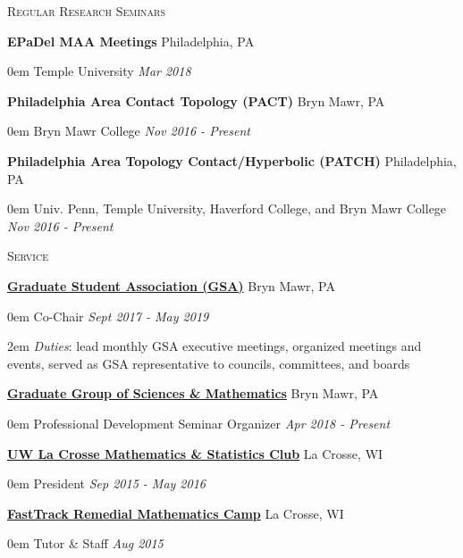\documentclass[11pt]{article}
\newenvironment{headitem}[2]{\hspace{.5em} \textbf{#1} \hfill #2 \begin{addmargin}[0em]{0em}}{\end{addmargin}}
\renewenvironment{section}[1]{\textsc{\large #1} \vskip5pt}{\vskip10pt}
\newcommand{\itemreg}[1]{\begin{addmargin}[.75em]{2em} #1 \end{addmargin}}
\newcommand{\itemdate}[2]{\hspace{.5em} #1 \hfill \textit{#2} \\}
\begin{document}
\begin{section}{Regular Research Seminars}
	
	\begin{headitem}{EPaDel MAA Meetings}{Philadelphia, PA}
		\itemdate{Temple University}{Mar 2018}
	\end{headitem}
	\vskip5pt
	
	\begin{headitem}{Philadelphia Area Contact Topology (PACT)}{Bryn Mawr, PA}
		\itemdate{Bryn Mawr College}{Nov 2016 - Present}
	\end{headitem}
	\vskip5pt
	
	\begin{headitem}{Philadelphia Area Topology Contact/Hyperbolic (PATCH)}{Philadelphia, PA}
		\itemdate{Univ. Penn, Temple University, Haverford College, and Bryn Mawr College}{Nov 2016 - Present}
	\end{headitem}
	
\end{section}



\begin{section}{Service}

	\begin{headitem}{\href{https://www.brynmawr.edu/gsas/}{Graduate Student Association (GSA)}}{Bryn Mawr, PA}
		\itemdate{Co-Chair}{Sept 2017 - May 2019}
		\itemreg{\textit{Duties}: lead monthly GSA executive meetings, organized meetings and events, served as GSA representative to councils, committees, and boards}
	\end{headitem}
	\vskip5pt
	
	\begin{headitem}{\href{https://www.brynmawr.edu/ggsm}{Graduate Group of Sciences \& Mathematics}}{Bryn Mawr, PA}
		\itemdate{Professional Development Seminar Organizer}{Apr 2018 - Present}
	\end{headitem}
	\vskip5pt
	
	\begin{headitem}{\href{https://www.uwlax.edu/mathematics/activities/mathematics-and-stats-club/}{UW La Crosse Mathematics \& Statistics Club}}{La Crosse, WI}
		\itemdate{President}{Sep 2015 - May 2016}
	\end{headitem}
	\vskip5pt
	
	\begin{headitem}{\href{https://www.uwlax.edu/mathematics/fasttrack/}{FastTrack Remedial Mathematics Camp}}{La Crosse, WI}
		\itemdate{Tutor \& Staff}{Aug 2015}
	\end{headitem}
	
\end{section}
\end{document}
